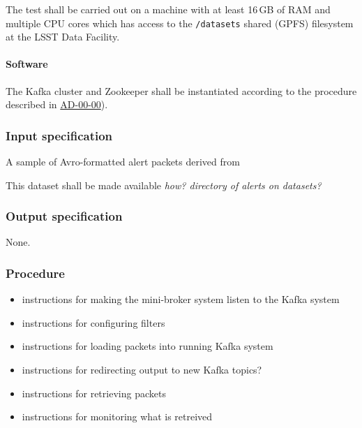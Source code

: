 The test shall be carried out on a machine with at least 16\,GB of RAM and
multiple CPU cores which has access to the \texttt{/datasets} shared (GPFS)
filesystem at the LSST Data Facility.

\paragraph{Software}

The Kafka cluster and Zookeeper shall be instantiated according to the 
procedure described in \hyperref[ad-00-00]{AD-00-00}).

\subsubsection{Input specification}

A sample of Avro-formatted alert packets derived from 

This dataset shall be made available \textit{how?  directory of alerts on datasets?}

\subsubsection{Output specification}

None.

\subsubsection{Procedure}

\begin{itemize}

  \item{instructions for making the mini-broker system listen to the Kafka system}

  \item{instructions for configuring filters}

  \item{instructions for loading packets into running Kafka system}

  \item{instructions for redirecting output to new Kafka topics?}

  \item{instructions for retrieving packets}

  \item{instructions for monitoring what is retreived}

\end{itemize}
